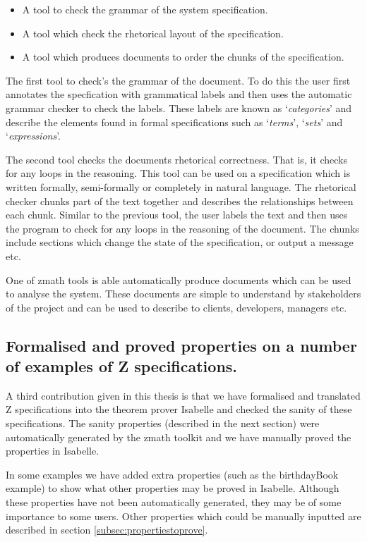 \begin{itemize}
\item A tool to check the grammar of the system specification.

\item A tool which check the rhetorical layout of the specification.

\item A tool which produces documents to order the chunks of the specification.
\end{itemize}

The first tool to check's the grammar of the document. To do this the user first annotates the specfication with grammatical labels and then uses the automatic grammar checker to check the labels. These labels are known as `\emph{categories}' and describe the elements found in formal specifications such as `\emph{terms}', `\emph{sets}' and `\emph{expressions}'. 

The second tool checks the documents rhetorical correctness. That is, it checks for any loops in the reasoning. This tool can be used on a specification which is written formally, semi-formally or completely in natural language. The rhetorical checker chunks part of the text together and describes the relationships between each chunk. Similar to the previous tool, the user labels the text and then uses the program to check for any loops in the reasoning of the document. The chunks include sections which change the state of the specification, or output a message etc.

One of \gls{zmath} tools is able automatically produce documents which can be used to analyse the system. These documents are simple to understand by stakeholders of the project and can be used to describe to clients, developers, managers etc. 

\subsection{Formalised and proved properties on a number of examples of Z specifications.}

A third contribution given in this thesis is that we have formalised and translated Z specifications into the theorem prover Isabelle and checked the sanity of these specifications. The sanity properties (described in the next section) were automatically generated by the \gls{zmath} toolkit and we have manually proved the properties in Isabelle.

In some examples we have added extra properties (such as the birthdayBook example) to show what other properties may be proved in Isabelle. Although these properties have not been automatically generated, they may be of some importance to some users. Other properties which could be manually inputted are described in section \ref{subsec:propertiestoprove}.

